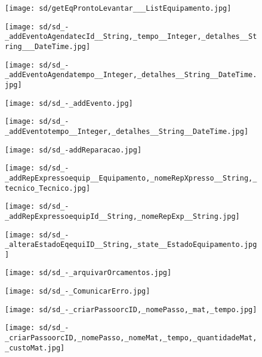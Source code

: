 \documentclass[relatorio.tex]{subfiles}
\begin{document}
\begin{landscape}
\begin{figure} \centering \texttt{[image: sd/getEqProntoLevantar\_\_\_ListEquipamento.jpg]} \end{figure}
\begin{figure} \centering \texttt{[image: sd/sd\_-\_addEventoAgendatecId\_\_String,\_tempo\_\_Integer,\_detalhes\_\_String\_\_\_DateTime.jpg]} \end{figure}
\begin{figure} \centering \texttt{[image: sd/sd\_-\_addEventoAgendatempo\_\_Integer,\_detalhes\_\_String\_\_DateTime.jpg]} \end{figure}
\begin{figure} \centering \texttt{[image: sd/sd\_-\_addEvento.jpg]} \end{figure}
\begin{figure} \centering \texttt{[image: sd/sd\_-\_addEventotempo\_\_Integer,\_detalhes\_\_String\_\_DateTime.jpg]} \end{figure}
\begin{figure} \centering \texttt{[image: sd/sd\_-addReparacao.jpg]} \end{figure}
\begin{figure} \centering \texttt{[image: sd/sd\_-\_addRepExpressoequip\_\_Equipamento,\_nomeRepXpresso\_\_String,\_tecnico\_Tecnico.jpg]} \end{figure}
\begin{figure} \centering \texttt{[image: sd/sd\_-\_addRepExpressoequipId\_\_String,\_nomeRepExp\_\_String.jpg]} \end{figure}
\begin{figure} \centering \texttt{[image: sd/sd\_-\_alteraEstadoEqequiID\_\_String,\_state\_\_EstadoEquipamento.jpg]} \end{figure}
\begin{figure} \centering \texttt{[image: sd/sd\_-\_arquivarOrcamentos.jpg]} \end{figure}
\begin{figure} \centering \texttt{[image: sd/sd\_-\_ComunicarErro.jpg]} \end{figure}
\begin{figure} \centering \texttt{[image: sd/sd\_-\_criarPassoorcID,\_nomePasso,\_mat,\_tempo.jpg]} \end{figure}
\begin{figure} \centering \texttt{[image: sd/sd\_-\_criarPassoorcID,\_nomePasso,\_nomeMat,\_tempo,\_quantidadeMat,\_custoMat.jpg]} \end{figure}

\end{landscape}
\end{document}

